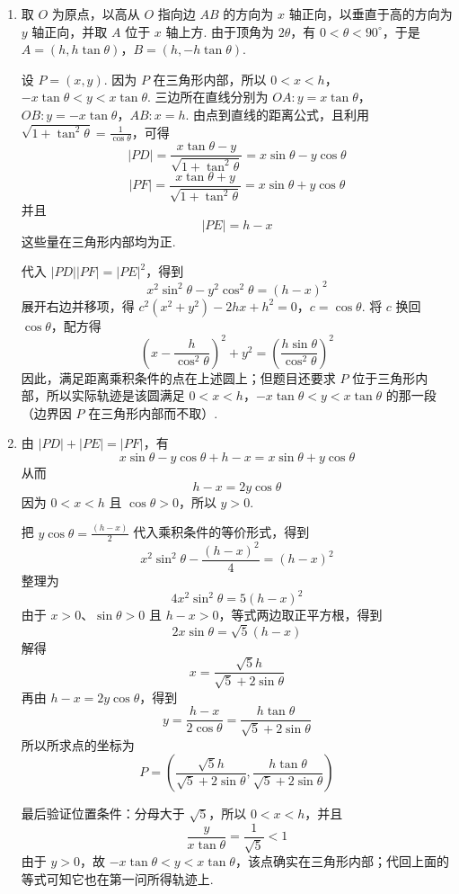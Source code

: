 \begin{solution}
\begin{enumerate}
\item 取 \(O\) 为原点，以高从 \(O\) 指向边 \(AB\) 的方向为 \(x\) 轴正向，以垂直于高的方向为 \(y\) 轴正向，并取 \(A\) 位于 \(x\) 轴上方. 由于顶角为 \(2\theta\)，有 \(0<\theta<90^{\circ}\)，于是
\(A=(h,h\tan\theta)\)，\(B=(h,-h\tan\theta)\).

设 \(P=(x,y)\). 因为 \(P\) 在三角形内部，所以
\(0<x<h\)，\(-x\tan\theta<y<x\tan\theta\).
三边所在直线分别为
\(OA: y=x\tan\theta\)，\(OB: y=-x\tan\theta\)，\(AB: x=h\).
由点到直线的距离公式，且利用 \(\sqrt{1+\tan^2\theta}=\frac{1}{\cos\theta}\)，可得
\[
\lvert PD\rvert
=\frac{x\tan\theta-y}{\sqrt{1+\tan^2\theta}}
=x\sin\theta-y\cos\theta
\]
\[
\lvert PF\rvert
=\frac{x\tan\theta+y}{\sqrt{1+\tan^2\theta}}
=x\sin\theta+y\cos\theta
\]
并且
\[
\lvert PE\rvert=h-x
\]
这些量在三角形内部均为正.

代入 \(\lvert PD\rvert\lvert PF\rvert=\lvert PE\rvert^2\)，得到
\[
x^2\sin^2\theta-y^2\cos^2\theta=(h-x)^2
\]
展开右边并移项，得
\(c^2\left(x^2+y^2\right)-2hx+h^2=0\)，\(c=\cos\theta\).
将 \(c\) 换回 \(\cos\theta\)，配方得
\[
\left(x-\frac{h}{\cos^2\theta}\right)^2+y^2
=\left(\frac{h\sin\theta}{\cos^2\theta}\right)^2
\]
因此，满足距离乘积条件的点在上述圆上；但题目还要求 \(P\) 位于三角形内部，所以实际轨迹是该圆满足
\(0<x<h\)，\(-x\tan\theta<y<x\tan\theta\)
的那一段（边界因 \(P\) 在三角形内部而不取）.

\item 由 \(\lvert PD\rvert+\lvert PE\rvert=\lvert PF\rvert\)，有
\[
x\sin\theta-y\cos\theta+h-x=x\sin\theta+y\cos\theta
\]
从而
\[
h-x=2y\cos\theta
\]
因为 \(0<x<h\) 且 \(\cos\theta>0\)，所以 \(y>0\).

把 \(y\cos\theta=\frac{(h-x)}{2}\) 代入乘积条件的等价形式，得到
\[
x^2\sin^2\theta-\frac{(h-x)^2}{4}=(h-x)^2
\]
整理为
\[
4x^2\sin^2\theta=5(h-x)^2
\]
由于 \(x>0\)、\(\sin\theta>0\) 且 \(h-x>0\)，等式两边取正平方根，得到
\[
2x\sin\theta=\sqrt{5}\left(h-x\right)
\]
解得
\[
x=\frac{\sqrt{5}h}{\sqrt{5}+2\sin\theta}
\]
再由 \(h-x=2y\cos\theta\)，得到
\[
y=\frac{h-x}{2\cos\theta}=\frac{h\tan\theta}{\sqrt{5}+2\sin\theta}
\]
所以所求点的坐标为
\[
P=\left(\frac{\sqrt{5}h}{\sqrt{5}+2\sin\theta},
\frac{h\tan\theta}{\sqrt{5}+2\sin\theta}\right)
\]

最后验证位置条件：分母大于 \(\sqrt5\)，所以 \(0<x<h\)，并且
\[
\frac{y}{x\tan\theta}=\frac{1}{\sqrt5}<1
\]
由于 \(y>0\)，故 \(-x\tan\theta<y<x\tan\theta\)，该点确实在三角形内部；代回上面的等式可知它也在第一问所得轨迹上.
\end{enumerate}
\end{solution}
